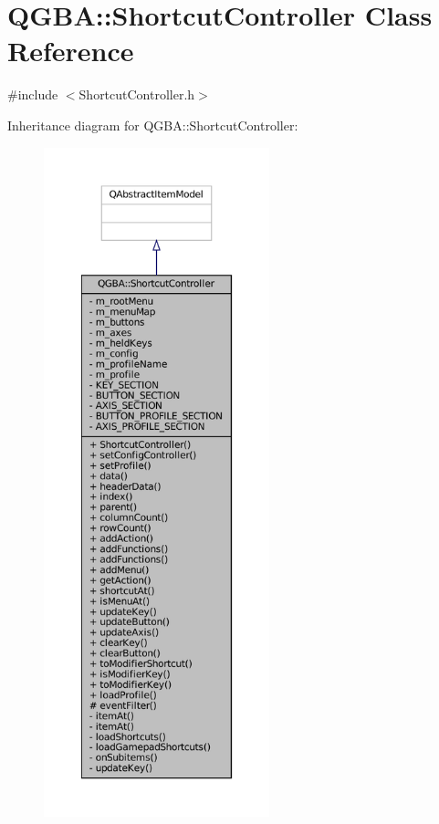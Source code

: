 \hypertarget{class_q_g_b_a_1_1_shortcut_controller}{}\section{Q\+G\+BA\+:\+:Shortcut\+Controller Class Reference}
\label{class_q_g_b_a_1_1_shortcut_controller}


{\ttfamily \#include $<$Shortcut\+Controller.\+h$>$}



Inheritance diagram for Q\+G\+BA\+:\+:Shortcut\+Controller\+:
\nopagebreak
\begin{figure}[H]
\begin{center}
\leavevmode
\includegraphics[height=550pt]{class_q_g_b_a_1_1_shortcut_controller__inherit__graph}
\end{center}
\end{figure}


